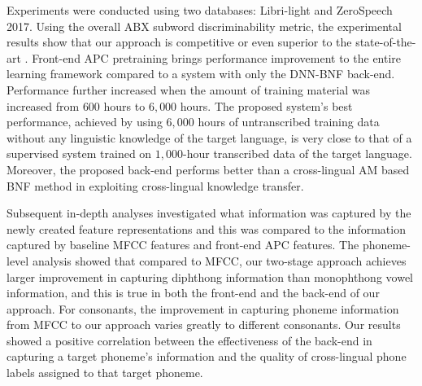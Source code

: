 \documentclass[transmag]{IEEEtran}
\begin{document}

Experiments were conducted using two databases: Libri-light and ZeroSpeech 2017. Using the overall ABX subword discriminability metric, 
the experimental results show that our approach is competitive or even superior to the state-of-the-art \cite{Kharitonov2020data_augment}. Front-end APC pretraining brings performance improvement to the entire learning framework compared to a system with only the DNN-BNF back-end. Performance further increased when the amount of training material was increased from $600$ hours to $6,000$ hours. The proposed system’s best performance, achieved by using $6,000$ hours of untranscribed training data without any linguistic knowledge of the target language, is very close to that of a supervised system trained on $1,000$-hour   transcribed data of the target language. Moreover,  the proposed back-end performs better than a cross-lingual AM based BNF method in exploiting cross-lingual knowledge transfer. 


Subsequent in-depth analyses investigated what information was captured by the newly created feature representations and this was compared to the information captured by baseline MFCC features and front-end APC features. The phoneme-level analysis showed that compared to MFCC, 
our two-stage approach achieves larger improvement in capturing diphthong information than monophthong vowel information,
and this is true in both the front-end and the back-end of our approach. For consonants, the improvement in capturing phoneme information from MFCC to our approach varies greatly to different consonants. Our results showed a positive correlation between the effectiveness of the back-end in capturing a target phoneme's information and the quality of cross-lingual phone labels assigned to that target phoneme.
\end{document}
